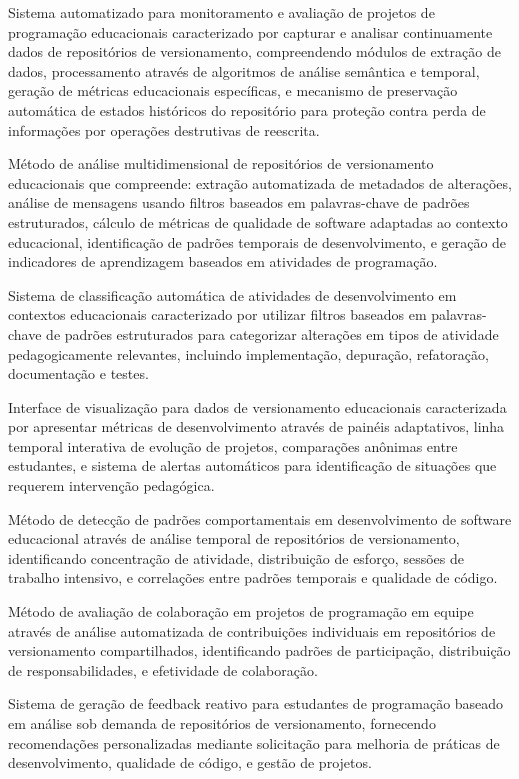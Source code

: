 \documentclass{patente}
\begin{document}
\begin{reivindicacoes}
  \item Sistema automatizado para monitoramento e avaliação de projetos de programação
  educacionais caracterizado por capturar e analisar continuamente dados de
  repositórios de versionamento, compreendendo módulos de extração de dados,
  processamento através de algoritmos de análise semântica e temporal, geração
  de métricas educacionais específicas, e mecanismo de preservação automática
  de estados históricos do repositório para proteção contra perda de informações
  por operações destrutivas de reescrita.

  \item Método de análise multidimensional de repositórios de versionamento
  educacionais que compreende: extração automatizada de metadados de alterações,
  análise de mensagens usando filtros baseados em palavras-chave de padrões
  estruturados, cálculo de métricas de qualidade de software adaptadas ao
  contexto educacional, identificação de padrões temporais de desenvolvimento, e
  geração de indicadores de aprendizagem baseados em atividades de programação.

  \item Sistema de classificação automática de atividades de desenvolvimento em
  contextos educacionais caracterizado por utilizar filtros baseados em
  palavras-chave de padrões estruturados para categorizar alterações em tipos de
  atividade pedagogicamente relevantes, incluindo implementação, depuração,
  refatoração, documentação e testes.

  \item Interface de visualização para dados de versionamento educacionais
  caracterizada por apresentar métricas de desenvolvimento através de painéis
  adaptativos, linha temporal interativa de evolução de projetos, comparações
  anônimas entre estudantes, e sistema de alertas automáticos para identificação
  de situações que requerem intervenção pedagógica.

  \item Método de detecção de padrões comportamentais em desenvolvimento de software
  educacional através de análise temporal de repositórios de versionamento,
  identificando concentração de atividade, distribuição de esforço, sessões de
  trabalho intensivo, e correlações entre padrões temporais e qualidade de
  código.


  \item Método de avaliação de colaboração em projetos de programação em equipe através
  de análise automatizada de contribuições individuais em repositórios de
  versionamento compartilhados, identificando padrões de participação,
  distribuição de responsabilidades, e efetividade de colaboração.

  \item Sistema de geração de feedback reativo para estudantes de programação
  baseado em análise sob demanda de repositórios de versionamento, fornecendo
  recomendações personalizadas mediante solicitação para melhoria de práticas de desenvolvimento,
  qualidade de código, e gestão de projetos.
\end{reivindicacoes}
\end{document}

